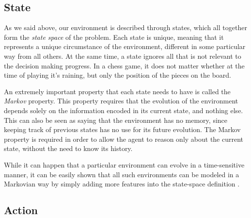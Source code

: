 \subsection{State}

As we said above, our environment is described through states, which all together form the
\textit{state space} of the problem. Each state is unique, meaning that it represents a unique
circumstance of the environment, different in some particular way from all others. At the same time,
a state ignores all that is not relevant to the decision making progress. In a chess game, it does
not matter whether at the time of playing it's raining, but only the position of the pieces on the
board.


An extremely important property that each state needs to have is called the \textit{Markov}
property. This property requires that the evolution of the environment depends solely on the
information encoded in its current state, and nothing else. This can also be seen as saying that the
environment has no memory, since keeping track of previous states has no use for its future
evolution. The Markov property is required in order to allow the agent to reason only about the
current state, without the need to know its history.

While it can happen that a particular environment can evolve in a time-sensitive manner, it can be
easily shown that all such environments can be modeled in a Markovian way by simply adding more
features into the state-space definition \cite{cit:boutilier}.

\subsection{Action}

